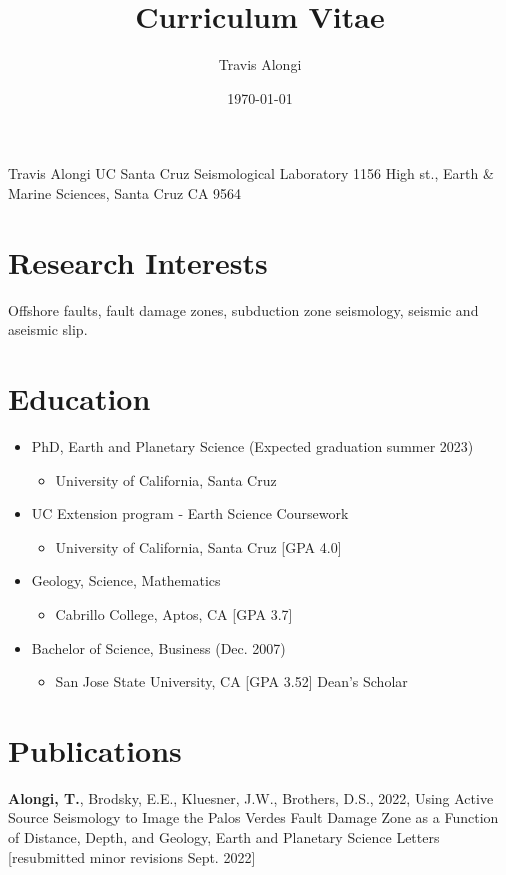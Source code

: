 \documentclass[11pt]{article}
\author{Travis Alongi}
\date{\today}
\title{Curriculum Vitae}
\begin{document}
\maketitle
Travis Alongi
UC Santa Cruz Seismological Laboratory
1156 High st., Earth \& Marine Sciences, Santa Cruz CA 9564

\section{Research Interests}
\label{sec:org96970a4}
Offshore faults, fault damage zones, subduction zone seismology, seismic and aseismic slip.

\section{Education}
\label{sec:orgfbf7b53}
\begin{itemize}
\item PhD, Earth and Planetary Science (Expected graduation summer 2023)
\begin{itemize}
\item University of California, Santa Cruz
\end{itemize}

\item UC Extension program - Earth Science Coursework
\begin{itemize}
\item University of California, Santa Cruz [GPA 4.0]
\end{itemize}

\item Geology, Science, Mathematics
\begin{itemize}
\item Cabrillo College, Aptos, CA [GPA 3.7]
\end{itemize}

\item Bachelor of Science, Business (Dec. 2007)
\begin{itemize}
\item San Jose State University, CA [GPA 3.52] Dean’s Scholar
\end{itemize}
\end{itemize}

\section{Publications}
\label{sec:orgbeca5d2}
\textbf{Alongi, T.}, Brodsky, E.E., Kluesner, J.W., Brothers, D.S., 2022, Using Active Source Seismology to Image the Palos Verdes Fault Damage Zone as a Function of Distance, Depth, and Geology, Earth and Planetary Science Letters [resubmitted minor revisions Sept. 2022]
\end{document}
